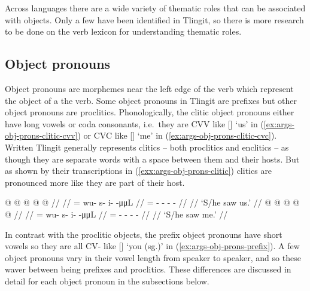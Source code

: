 Across languages there are a wide variety of thematic roles that can be associated with objects. Only a few have been identified in Tlingit, so there is more research to be done on the verb lexicon for understanding thematic roles.

\subsection{Object pronouns}\label{sec:args-obj-prons}

Object pronouns are morphemes near the left edge of the verb which represent the object of a the verb. Some object pronouns in Tlingit are prefixes but other object pronouns are proclitics. Phonologically, the clitic object pronouns either have long vowels or coda consonants, i.e.\ they are CVV like  [] ‘us’ in (\ref{ex:args-obj-prons-clitic-cvv}) or CVC like  [] ‘me’ in (\ref{ex:args-obj-prons-clitic-cvc}). Written Tlingit generally represents clitics – both proclitics and enclitics – as though they are separate words with a space between them and their hosts. But as shown by their transcriptions in (\ref{exx:args-obj-prons-clitic}) clitics are pronounced more like they are part of their host.

\pex\label{exx:args-obj-prons-clitic}%
\a\label{ex:args-obj-prons-clitic-cvv}%
%
\begingl
	\gla	{} @  @ {} @ {} @ {} @ {} //
	\glp	\llap{[}\rlap{\ipa{\gm{hàː}w.sì.ˈtʰìːn}]} {} {} {} {} {} //
	\glb	{}= wu- s- i-  -μμL //
	\glc	{}= - - -  - //
	\gld	{}  {} {} {} {} //
	\glft	‘S/he saw us.’
		//
\endgl
\a\label{ex:args-obj-prons-clitic-cvc}%
%
\begingl
	\gla	{} @  @ {} @ {} @ {} @ {} //
	\glp	\llap{[}\rlap{\ipa{\gm{χàt}.wù.sì.ˈtʰìːn}]} {} {} {} {} {} //
	\glb	{}= wu- s- i-  -μμL //
	\glc	{}= - - -  - //
	\gld	{}  {} {} {} {} //
	\glft	‘S/he saw me.’
		//
\endgl
\xe

In contrast with the proclitic objects, the prefix object pronouns have short vowels so they are all CV- like  [] ‘you (sg.)’ in (\ref{ex:args-obj-prons-prefix}). A few object pronouns vary in their vowel length from speaker to speaker, and so these waver between being prefixes and proclitics. These differences are discussed in detail for each object pronoun in the subsections below.

